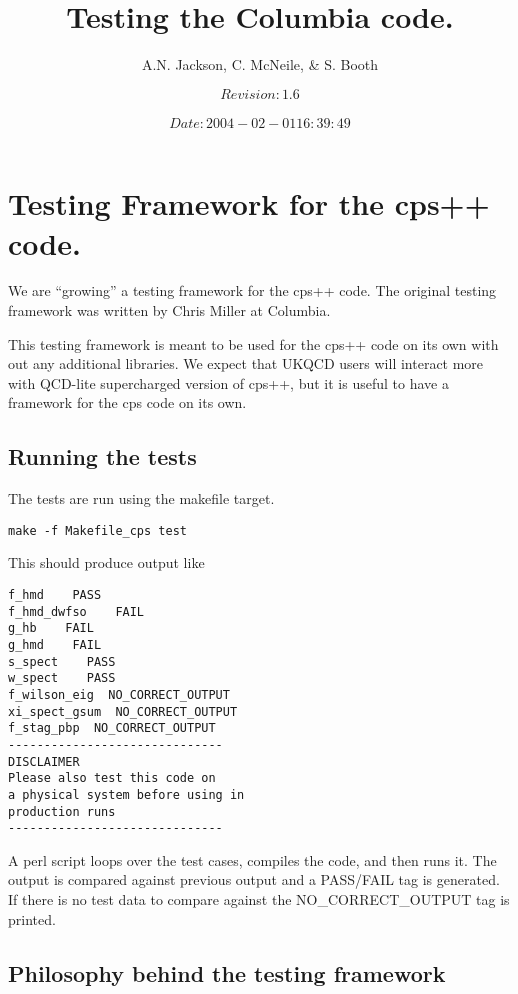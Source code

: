 \documentclass[12pt]{article}
\title{Testing the Columbia code.}
\author{A.N. Jackson, C. McNeile,  \& S. Booth}
\date{\mbox{\small $$Revision: 1.6 $$  $$Date: 2004-02-01 16:39:49 $$}}
\begin{document}
\maketitle

\tableofcontents
\newpage

\section{Testing Framework for the cps++ code.}

We are ``growing'' a testing framework for the cps++ code.
The original testing framework was written by Chris Miller
at Columbia.


This testing framework is meant to be used for the 
cps++ code on its own with out any additional libraries.
We expect that UKQCD users will interact more with 
QCD-lite supercharged version of cps++, but it is useful to 
have a framework for the cps code on its own.

\subsection{Running the tests}

The tests are run using the makefile target.
\begin{verbatim}
make -f Makefile_cps test
\end{verbatim}
This should produce output like
\begin{verbatim}
f_hmd    PASS
f_hmd_dwfso    FAIL
g_hb    FAIL
g_hmd    FAIL
s_spect    PASS
w_spect    PASS
f_wilson_eig  NO_CORRECT_OUTPUT
xi_spect_gsum  NO_CORRECT_OUTPUT
f_stag_pbp  NO_CORRECT_OUTPUT
------------------------------
DISCLAIMER
Please also test this code on
a physical system before using in
production runs
------------------------------

\end{verbatim}

A perl script loops over the test cases, compiles the code,
and then runs it. The output is compared against
previous output and a PASS/FAIL tag is generated.
If there is no test data to compare against the
NO\_CORRECT\_OUTPUT tag is printed.

\subsection{Philosophy behind the testing framework}
\end{document}
